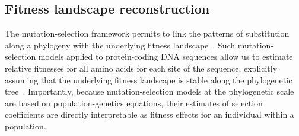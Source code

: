 \documentclass{article}
\begin{document}
    \subsection*{Fitness landscape reconstruction}
    The mutation-selection framework permits to link the patterns of substitution along a phylogeny with the underlying fitness landscape~\cite{halpern_evolutionary_1998, mccandlish_modeling_2014}.
    Such mutation-selection models applied to protein-coding DNA sequences allow us to estimate relative fitnesses for all amino acids for each site of the sequence, explicitly assuming that the underlying fitness landscape is stable along the phylogenetic tree~\cite{rodrigue_mechanistic_2010, tamuri_estimating_2012, rodrigue_detecting_2017}.
    Importantly, because mutation-selection models at the phylogenetic scale are based on population-genetics equations, their estimates of selection coefficients are directly interpretable as fitness effects for an individual within a population.
\end{document}
